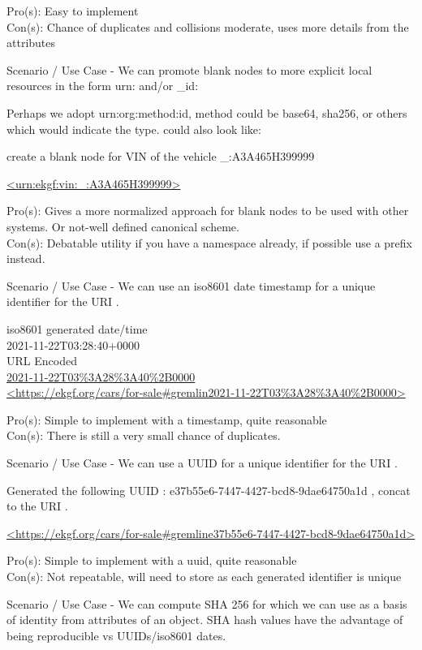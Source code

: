 Pro(s): Easy to implement \\
Con(s): Chance of duplicates and collisions moderate, uses more details from the attributes


Scenario / Use Case -
We can promote blank nodes to more explicit local resources in the form urn: and/or \_id:

Perhaps we adopt urn:org:method:id, method could be base64, sha256, or others which would indicate the type.
could also look like:

create a blank node for VIN of the vehicle
    {\footnotesize \_:A3A465H399999}

    {\footnotesize\url{<urn:ekgf:vin:_:A3A465H399999>}}

Pro(s): Gives a more normalized approach for blank nodes to be used with other systems.
Or not-well defined canonical scheme. \\
Con(s): Debatable utility if you have a namespace already, if possible use a prefix instead.

Scenario / Use Case -
We can use an iso8601 date timestamp for a unique identifier for the URI .

iso8601 generated date/time \\
2021-11-22T03:28:40+0000 \\
URL Encoded \\
{\url {2021-11-22T03%3A28%3A40%2B0000}} \\
    {\footnotesize\url{<https://ekgf.org/cars/for-sale#gremlin2021-11-22T03%3A28%3A40%2B0000>}}

Pro(s): Simple to implement with a timestamp, quite reasonable \\
Con(s): There is still a very small chance of duplicates.

Scenario / Use Case -
We can use a UUID for a unique identifier for the URI .

Generated the following UUID :
    {\footnotesize e37b55e6-7447-4427-bcd8-9dae64750a1d }, concat to the URI .

    {\footnotesize\url{<https://ekgf.org/cars/for-sale#gremline37b55e6-7447-4427-bcd8-9dae64750a1d>}}

Pro(s): Simple to implement with a uuid, quite reasonable \\
Con(s): Not repeatable, will need to store as each generated identifier is unique

Scenario / Use Case -
We can compute SHA 256 for which we can use as a basis of identity from attributes of an object.
SHA hash values have the advantage of being reproducible vs UUIDs/iso8601 dates.

